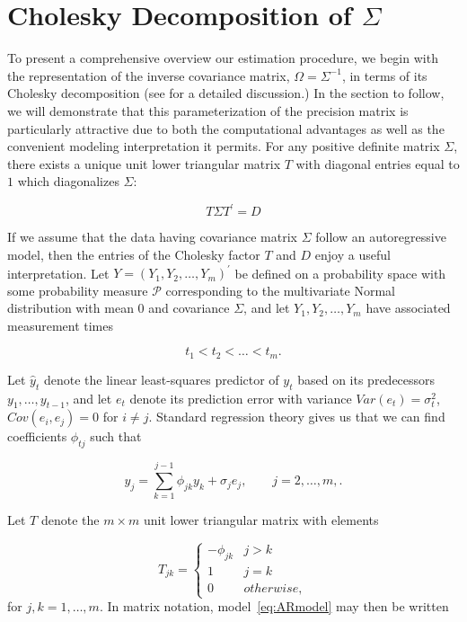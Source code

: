 \documentclass[12pt]{article}
\theoremstyle{definition}
\begin{document}
\section{Cholesky Decomposition of $\Sigma$}

To present a comprehensive overview our estimation procedure, we begin with the representation of the inverse covariance matrix, $\Omega = \Sigma^{-1}$, in terms of its Cholesky decomposition (see \citet{pourahmadi2007cholesky} for a detailed discussion.) In the section to follow, we will demonstrate that this parameterization of the precision matrix is particularly attractive due to both the computational advantages as well as the convenient modeling interpretation it permits. For any positive definite matrix $\Sigma$, there exists a unique unit lower triangular matrix $T$ with diagonal entries equal to $1$ which diagonalizes $\Sigma$:

\begin{equation}
\nonumber T \Sigma T^\prime = D
\end{equation}
\noindent

If we assume that the data having covariance matrix $\Sigma$ follow an autoregressive model, then the entries of the Cholesky factor $T$ and $D$ enjoy a useful interpretation. Let $Y = \left( Y_{1}, Y_{2}, \dots, Y_{m} \right)^\prime$ be defined on a probability space with some probability measure $\mathcal{P}$ corresponding to the multivariate Normal distribution with mean $0$ and covariance $\Sigma$, and let $Y_1,Y_2,\dots, Y_m$ have associated measurement times 

\[
t_{1} < t_{2} < \dots< t_{m}.
\]


Let $\hat{y}_t$ denote the linear least-squares predictor of $y_t$ based on its predecessors $y_1,\dots, y_{t-1}$, and let $e_t$ denote its prediction error with variance $Var\left(e_t\right)=\sigma_t^2$, $Cov\left(e_i,e_j\right)=0$ for $i \ne j$. Standard regression theory gives us that we can find coefficients $\phi_{tj}$ such that

\begin{equation}
{y}_{j}  = \sum_{k=1}^{j-1} \phi_{jk} y_{k} + \sigma_{j}e_{j}, \qquad j=2,\dots,m, \label{eq:ARmodel}.
\end{equation}

Let $T$ denote the $m \times m$ unit lower triangular matrix with elements 

\[
T_{jk} = \left\{
\begin{array}{ll}
-\phi_{jk} & j > k\\
1 & j = k \\
0 & otherwise,
\end{array}\right.
\]
\noindent
for $j,k=1,\dots,m$. In matrix notation,  model~\ref{eq:ARmodel} may then be written
\end{document}
